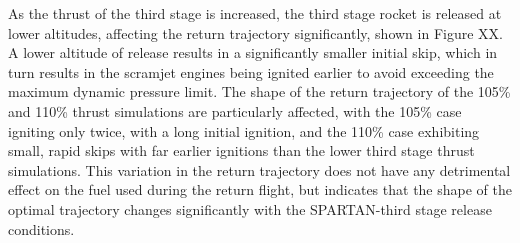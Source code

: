  As the thrust of the third stage is increased, the third stage rocket is released at lower altitudes, affecting the return trajectory significantly, shown in Figure XX. A lower altitude of release results in a significantly smaller initial skip, which in turn results in the scramjet engines being ignited earlier to avoid exceeding the maximum dynamic pressure limit. The shape of the return trajectory of the 105\% and 110\% thrust simulations are particularly affected, with the 105\% case igniting only twice, with a long initial ignition, and the 110\% case exhibiting  small, rapid skips with far earlier ignitions than the lower third stage thrust simulations. 
This variation in the return trajectory does not have any detrimental effect on the fuel used during the return flight, but indicates that the shape of the optimal trajectory changes significantly with the SPARTAN-third stage release conditions.   




